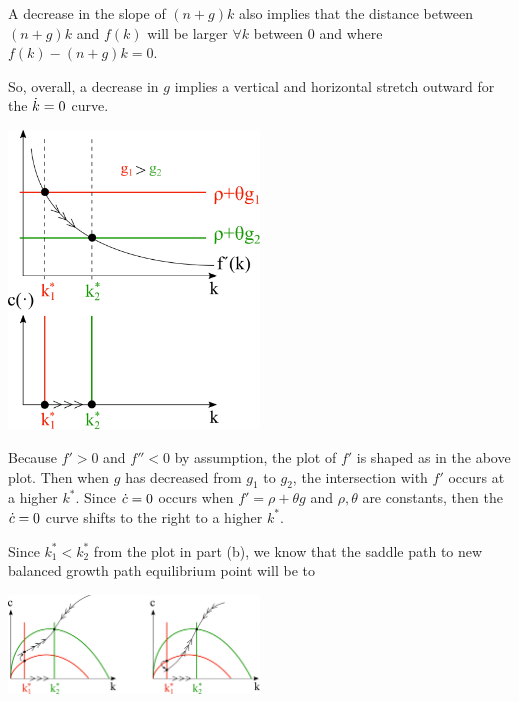 \documentclass[12pt]{article}
\begin{document}
A decrease in the slope of $(n+g)k$ also implies that the distance between $(n+g)k$ and $f(k)$ will be larger $\forall k$ between 0 and where $f(k)-(n+g)k=0$.

\noindent
So, overall, a decrease in $g$ implies a vertical and horizontal stretch outward for the $\dot k = 0$ curve.


\newpage{}

\includegraphics[width=0.5\textwidth]{1.b}

Because $f'>0$ and $f''<0$ by assumption, the plot of $f'$ is shaped as in the above plot. Then when $g$ has decreased from $g_1$ to $g_2$, the intersection with $f'$ occurs at a higher $k^*$. Since $\dot c=0$ occurs when $f'=\rho+\theta g$ and $\rho, \theta$ are constants, then the $\dot c=0$ curve shifts to the right to a higher $k^*$.
  

\newpage{}

Since $k_1^* < k_2^*$ from the plot in part (b), we know that the saddle path to new balanced growth path equilibrium point will be to

\includegraphics[width=0.5\textwidth]{1.c}
\end{document}
